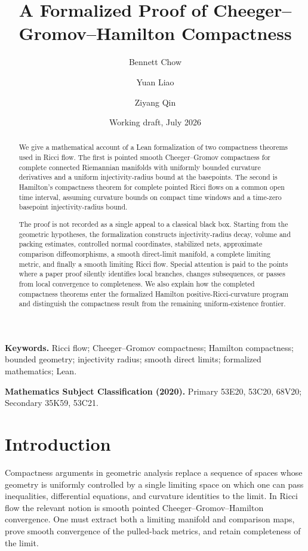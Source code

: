 \documentclass[11pt]{article}
\title{A Formalized Proof of Cheeger--Gromov--Hamilton Compactness}
\author{Bennett Chow \and Yuan Liao \and Ziyang Qin}
\date{Working draft, July 2026}
\theoremstyle{plain}
\theoremstyle{definition}
\theoremstyle{remark}
\begin{document}
\maketitle

\begin{abstract}
We give a mathematical account of a Lean formalization of two compactness
theorems used in Ricci flow.  The first is pointed smooth
Cheeger--Gromov compactness for complete connected Riemannian manifolds with
uniformly bounded curvature derivatives and a uniform injectivity-radius
bound at the basepoints.  The second is Hamilton's compactness theorem for
complete pointed Ricci flows on a common open time interval, assuming
curvature bounds on compact time windows and a time-zero basepoint
injectivity-radius bound.

The proof is not recorded as a single appeal to a classical black box.
Starting from the geometric hypotheses, the formalization constructs
injectivity-radius decay, volume and packing estimates, controlled normal
coordinates, stabilized nets, approximate comparison diffeomorphisms, a
smooth direct-limit manifold, a complete limiting metric, and finally a
smooth limiting Ricci flow.  Special attention is paid to the points where a
paper proof silently identifies local branches, changes subsequences, or
passes from local convergence to completeness.  We also explain how the
completed compactness theorems enter the formalized Hamilton
positive-Ricci-curvature program and distinguish the compactness result from
the remaining uniform-existence frontier.
\end{abstract}

\noindent\textbf{Keywords.}
Ricci flow; Cheeger--Gromov compactness; Hamilton compactness; bounded
geometry; injectivity radius; smooth direct limits; formalized mathematics;
Lean.

\medskip
\noindent\textbf{Mathematics Subject Classification (2020).}
Primary 53E20, 53C20, 68V20; Secondary 35K59, 53C21.

\tableofcontents

\section{Introduction}

Compactness arguments in geometric analysis replace a sequence of spaces
whose geometry is uniformly controlled by a single limiting space on which
one can pass inequalities, differential equations, and curvature identities
to the limit.  In Ricci flow the relevant notion is smooth pointed
Cheeger--Gromov--Hamilton convergence.  One must extract both a limiting
manifold and comparison maps, prove smooth convergence of the pulled-back
metrics, and retain completeness of the limit.
\end{document}
